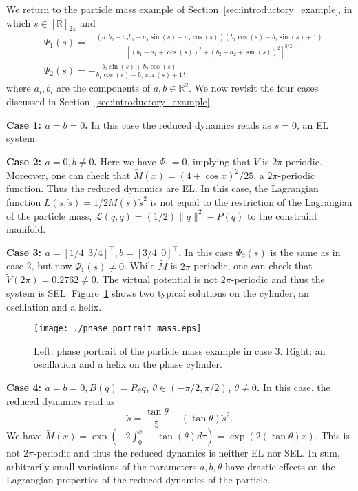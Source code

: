 \begin{example}
	We return to the particle mass example of
	Section~\ref{sec:introductory_example}, in which $s \in [\mathbb{R}]_{2 \pi}$
	and
				\[
	\begin{aligned}
	& \Psi_1(s) = - \frac{\left(a_1 b_2 + a_2 b_1 -a_1 \sin(s)+a_2
		\cos(s)\right)\left(b_1 \cos(s)+b_2 \sin(s) +1\right)}{\left[(b_1
		- a_1 + \cos(s))^2 + (b_2 - a_2 + \sin(s))^2\right]^{3/2}} \\
			& \Psi_2(s) = -\frac{b_1 \sin(s) + b_2 \cos(s)}{b_1 \cos(s) + b_2
		\sin(s) +1},
	\end{aligned}
	\]
				where $a_i,b_i$ are the components of $a,b \in \mathbb{R}^2$.  We now revisit
	the four cases discussed in Section~\ref{sec:introductory_example}.
	
	{\bf Case 1: $a =b=0$.} In this case the reduced dynamics reads as
	$\ddot s=0$, an EL system.
	
	{\bf Case 2: $a=0,b \neq 0$.} Here we have $\Psi_1=0$, implying that
	$\tilde V$ is $2 \pi$-periodic. Moreover, one can check that $\tilde
	M(x) = (4+\cos x)^2/25$, a $2\pi$-periodic function. Thus the reduced
	dynamics are EL.  In this case, the Lagrangian function $L(s,\dot s) =
	1/2 M(s) \dot s^2$ is not equal to the restriction of the Lagrangian
	of the particle mass, $\mathcal{L}(q,\dot q) = (1/2) \|\dot q\|^2 - P(q)$ to
	the constraint manifold.
	
	{\bf Case 3: $a=[1/4 \ \ 3/4]^\top, b=[3/4 \ \ 0]^\top$.} In this
	case $\Psi_2(s)$ is the same as in case 2, but now $\Psi_1(s)\neq
	0$. While $\tilde M$ is $2 \pi$-periodic, one can check that $\tilde
	V(2 \pi) = 0.2762 \neq 0$. The virtual potential is not
	$2\pi$-periodic and thus the system is
	SEL. Figure~\ref{fig:particle:SEL} shows two typical solutions on the
	cylinder, an oscillation and a helix.
				\begin{figure}
		\centerline{\texttt{[image: ./phase\_portrait\_mass.eps]}}
		\caption{Left: phase portrait of the particle mass example in case 3. Right: 
			an oscillation and a helix on the phase cylinder.}
		\label{fig:particle:SEL}
	\end{figure}
				
	{\bf Case 4: $a=b=0, B(q) = R_\theta q$, $\theta \in (-\pi/2,\pi/2)$,
		$\theta \neq 0$.} In this case, the reduced dynamics read as
	\[
	\ddot s = \frac{\tan \theta } 5 - (\tan \theta) \ddot s^2.
	\]
	We have $\tilde M(x) = \exp(-2 \int_0^x -\tan (\theta) d \tau) =
	\exp(2 (\tan \theta) x)$. This is not $2 \pi$-periodic and thus the
	reduced dynamics is neither EL nor SEL.  In sum, arbitrarily small
	variations of the parameters $a,b,\theta$ have drastic effects on the
	Lagrangian properties of the reduced dynamics of the particle.
\end{example}




